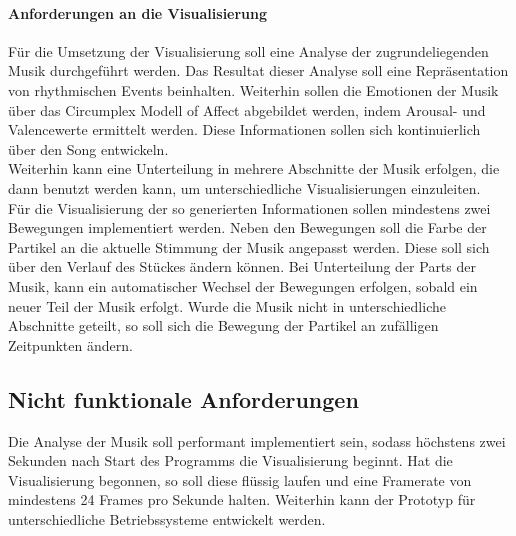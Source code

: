 \documentclass[11pt,a4paper]{article}
\begin{document}
\paragraph{Anforderungen an die Visualisierung}
Für die Umsetzung der Visualisierung soll eine Analyse der zugrundeliegenden Musik durchgeführt werden. Das Resultat dieser Analyse soll eine Repräsentation von rhythmischen Events beinhalten. Weiterhin sollen die Emotionen der Musik über das Circumplex Modell of Affect abgebildet werden, indem Arousal- und Valencewerte ermittelt werden. Diese Informationen sollen sich kontinuierlich über den Song entwickeln.\\
Weiterhin kann eine Unterteilung in mehrere Abschnitte der Musik erfolgen, die dann benutzt werden kann, um unterschiedliche Visualisierungen einzuleiten.\\
Für die Visualisierung der so generierten Informationen sollen mindestens zwei Bewegungen implementiert werden. Neben den Bewegungen soll die Farbe der Partikel an die aktuelle Stimmung der Musik angepasst werden. Diese soll sich über den Verlauf des Stückes ändern können. Bei Unterteilung der Parts der Musik, kann ein automatischer Wechsel der Bewegungen erfolgen, sobald ein neuer Teil der Musik erfolgt. Wurde die Musik nicht in unterschiedliche Abschnitte geteilt, so soll sich die Bewegung der Partikel an zufälligen Zeitpunkten ändern.

\subsection{Nicht funktionale Anforderungen}
Die Analyse der Musik soll performant implementiert sein, sodass höchstens zwei Sekunden nach Start des Programms die Visualisierung beginnt. Hat die Visualisierung begonnen, so soll diese flüssig laufen und eine Framerate von mindestens 24 Frames pro Sekunde halten. Weiterhin kann der Prototyp für unterschiedliche Betriebssysteme entwickelt werden.
\end{document}
